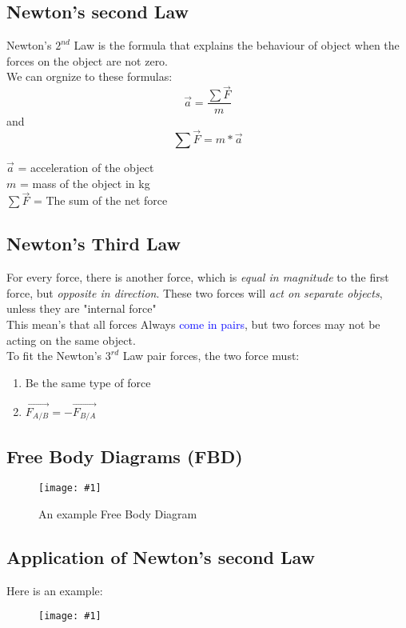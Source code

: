 \documentclass[11pt]{report}
\theoremstyle{remark}
\newcommand{\mypic}[3]{
    \begin{figure}[h!]
        \centering
        \texttt{[image: \#1]}
        \caption{#2}
    \end{figure}
}
\begin{document}
\subsection{Newton's second Law}
Newton's $2^{nd}$ Law is the formula that explains the behaviour of object when the forces on the object 
are not zero. \\
We can orgnize to these formulas:
\begin{equation}
    \vec{a} = \frac{\sum \vec{F}}{m}
\end{equation}
and\\
\begin{equation}
    \sum \vec{F} = m * \vec{a}
\end{equation}
\begin{center}
    $\vec{a}$ = acceleration of the object \\ 
    $m$ = mass of the object in kg \\ 
    $\sum \vec{F}$ = The sum of the net force
\end{center}

\subsection{Newton's Third Law}
For every force, there is another force, which is \textit{equal in magnitude} to the first force, 
but \textit{opposite in direction}. These two forces will \textit{act on separate objects},
unless they are "internal force"\\ 
This mean's that all forces Always \textcolor{blue}{come in pairs}, but two forces may not be 
acting on the same object. \\

To fit the Newton's $3^{rd}$ Law pair forces, the two force must:
\begin{enumerate}
    \item Be the same type of force
    \item $\vec{F_{A/B}} = -\vec{F_{B/A}}$
\end{enumerate}
\newpage
\subsection{Free Body Diagrams (FBD)}
\mypic{graph/graph6.png}{An example Free Body Diagram}{0.7}

\subsection{Application of Newton's second Law}
Here is an example:
\mypic{graph/graph7.png}{}{0.8}
\end{document}
